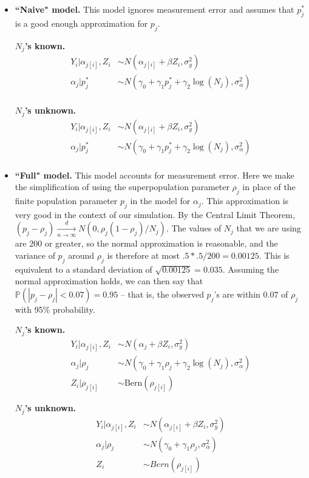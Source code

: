 \documentclass[10pt,a4paper]{article}
\begin{document}
\begin{itemize}
	\item \textbf{``Naive" model.} This model ignores measurement error and assumes that $p^*_j$ is a good enough approximation for $p_j$.
	
		\textbf{$N_j$'s known.}
			\begin{align*}
				Y_i | \alpha_{j[i]}, Z_i &\sim N(\alpha_{j[i]} + \beta Z_i, \sigma_y^2) \\
				\alpha_j | p^*_j &\sim N(\gamma_0 + \gamma_1 p^*_j + \gamma_2 \log(N_j), \sigma_{\alpha}^2) \\
			\end{align*}

		\textbf{$N_j$'s unknown.}
			\begin{align*}
				Y_i | \alpha_{j[i]}, Z_i &\sim N(\alpha_{j[i]} + \beta Z_i, \sigma_y^2) \\
				\alpha_j | p^*_j &\sim N(\gamma_0 + \gamma_1 p^*_j + \gamma_2 \log(N_j), \sigma_{\alpha}^2) \\
			\end{align*}
						
	\item \textbf{``Full" model.} This model accounts for measurement error. Here we make the simplification of using the superpopulation parameter $\rho_j$ in place of the finite population parameter $p_j$ in the model for $\alpha_j$. This approximation is very good in the context of our simulation. By the Central Limit Theorem, $(p_j - \rho_j) \xrightarrow[n \rightarrow \infty]{d} N(0, \rho_j (1 - \rho_j)/N_j)$. The values of $N_j$ that we are using are 200 or greater, so the normal approximation is reasonable, and the variance of $p_j$ around $\rho_j$ is therefore at most $.5*.5/200=0.00125$. This is equivalent to a standard deviation of $\sqrt{0.00125}=0.035$. Assuming the normal approximation holds, we can then say that $\mathbb{P}(|p_j - \rho_j| < 0.07) = 0.95$ -- that is, the observed $p_j$'s are within $0.07$ of $\rho_j$ with 95\% probability.
	
		\textbf{$N_j$'s known.}
			\begin{align*}
				Y_i | \alpha_{j[i]}, Z_i &\sim N(\alpha_j + \beta Z_i, \sigma_y^2) \\
				\alpha_j | \rho_j &\sim N(\gamma_0 + \gamma_1 \rho_j + \gamma_2 \log(N_j), \sigma_{\alpha}^2) \\
				Z_i | \rho_{j[i]} &\sim \mathrm{Bern}(\rho_{j[i]})
			\end{align*}	
			
		\textbf{$N_j$'s unknown.} 
			\begin{align*}
				Y_i | \alpha_{j[i]}, Z_i &\sim N(\alpha_{j[i]}	 + \beta Z_i, \sigma_y^2) \\
				\alpha_j | \rho_j &\sim N(\gamma_0 + \gamma_1 \rho_j, \sigma_{\alpha}^2) \\
				Z_i &\sim Bern(\rho_{j[i]})
			\end{align*}
\end{itemize}
\end{document}

